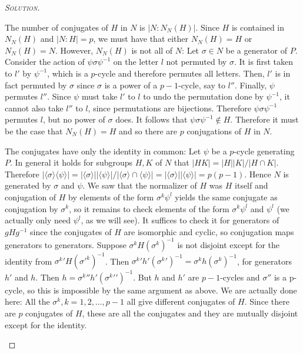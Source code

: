 \begin{proof}[{\scshape Solution}]
\begin{enumerate}[font=\normalfont,label=\textbf{(\Alph*)}, wide]
    The number of conjugates of $H$ in $N$ is $\lvert N : N_N(H) \rvert$. Since $H$ is contained in $N_N(H)$ and $\lvert N : H \rvert = p$, we must have that either $N_N(H) = H$ or $N_N(H) = N$. However, $N_N(H)$ is not all of $N$: Let $\sigma \in N$ be a generator of $P$. Consider the action of $\psi\sigma\psi^{-1}$ on the letter $l$ not permuted by $\sigma$. It is first taken to $l'$ by $\psi^{-1}$, which is a $p$-cycle and therefore permutes all letters. Then, $l'$ is in fact permuted by $\sigma$ since $\sigma$ is a power of a $p-1$-cycle, say to $l''$. Finally, $\psi$ permutes $l''$. Since $\psi$ must take $l'$ to $l$ to undo the permutation done by $\psi^{-1}$, it cannot also take $l''$ to $l$, since permutations are bijections. Therefore $\psi\sigma\psi^{-1}$ permutes $l$, but no power of $\sigma$ does. It follows that $\psi\sigma\psi^{-1} \not \in H$. Therefore it must be the case that $N_N(H) = H$ and so there are $p$ conjugations of $H$ in $N$.

    The conjugates have only the identity in common: Let $\psi$ be a $p$-cycle generating $P$. In general it holds for subgroups $H, K$ of $N$ that $\lvert HK \rvert = \lvert H\rvert \lvert K \rvert / \lvert H\cap K \rvert$. Therefore $\lvert \langle \sigma \rangle\langle \psi \rangle\rvert  = \lvert \langle \sigma \rangle \rvert\lvert \langle \psi \rangle\rvert/\lvert \langle \sigma \rangle \cap \langle \psi \rangle \rvert = \lvert \langle \sigma \rangle \rvert\lvert \langle \psi \rangle\rvert = p(p-1)$. Hence $N$ is generated by $\sigma$ and $\psi$. We saw that the normalizer of $H$ was $H$ itself and conjugation of $H$ by elements of the form $\sigma^k\psi^l$ yields the same conjugate as conjugation by $\sigma^k$, so it remains to check elements of the form $\sigma^k\psi^l$ and $\psi^l$ (we actually only need $\psi^l$, as we will see). It suffices to check it for generators of $gHg^{-1}$ since the conjugates of $H$ are isomorphic and cyclic, so conjugation maps generators to generators. Suppose $\sigma^k H(\sigma^k)^{-1}$ is not disjoint except for the identity from ${\sigma^k}'H({\sigma'}^k)^{-1}$. Then ${\sigma^k}'h'({\sigma^k}')^{-1} = \sigma^k h(\sigma^k)^{-1}$, for generators $h'$ and $h$. Then $h = {\sigma^k}{''}h'({\sigma^k}{'}')^{-1}$. But $h$ and $h'$ are $p-1$-cycles and $\sigma''$ is a p-cycle, so this is impossible by the same argument as above. We are actually done here: All the $\sigma^k, k = 1, 2, \ldots, p-1$ all give different conjugates of $H$. Since there are $p$ conjugates of $H$, these are all the conjugates and they are mutually disjoint except for the identity.


\end{enumerate}
\end{proof}
